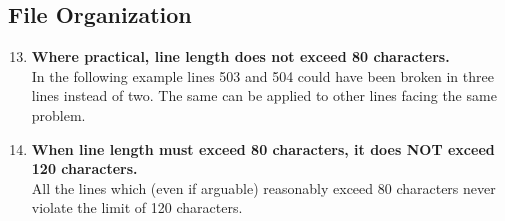 \documentclass[a4paper,11pt]{report} %
\begin{document}
		\subsection*{File Organization}\begin{enumerate}[resume]
			\setcounter{enumi}{12}
			\item \textbf{Where practical, line length does not exceed 80 characters.}\smallskip \\
				In the following example lines 503 and 504 could have been broken in three lines instead of two. The same can be applied to other lines facing the same problem.
				
			\item \textbf{When line length must exceed 80 characters, it does NOT exceed 120 characters.}\smallskip \\
				All the lines which (even if arguable) reasonably exceed 80 characters never violate the limit of 120 characters.
		\end{enumerate}
		
\end{document}
